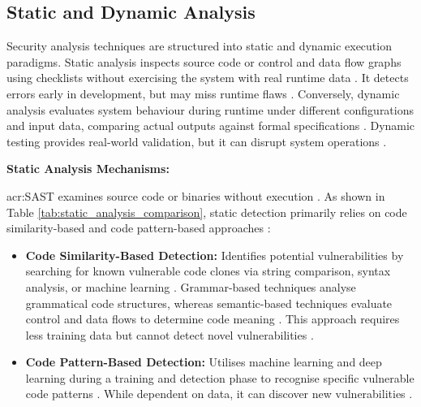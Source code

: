 \subsection{Static and Dynamic Analysis}
\label{subsec:static_dynamic_analysis}

Security analysis techniques are structured into static and dynamic execution paradigms. Static analysis inspects source code or control and data flow graphs using checklists without exercising the system with real runtime data \cite[p. 35]{richier2011security}. It detects errors early in development, but may miss runtime flaws \cite[p. 1]{cong2024overview}. Conversely, dynamic analysis evaluates system behaviour during runtime under different configurations and input data, comparing actual outputs against formal specifications \cite[p. 35]{richier2011security}. Dynamic testing provides real-world validation, but it can disrupt system operations \cite[p. 1]{cong2024overview}. 

\textbf{Static Analysis Mechanisms:} 

\gls{acr:SAST} examines source code or binaries without execution \cite{GeeksforGeeksSecurityTesting}. As shown in Table \ref{tab:static_analysis_comparison}, static detection primarily relies on code similarity-based and code pattern-based approaches \cite[pp. 3]{cong2024overview}:

\begin{itemize}
	\item \textbf{Code Similarity-Based Detection:} Identifies potential vulnerabilities by searching for known vulnerable code clones via string comparison, syntax analysis, or machine learning \cite[p. 3]{cong2024overview}. Grammar-based techniques analyse grammatical code structures, whereas semantic-based techniques evaluate control and data flows to determine code meaning \cite[pp. 4]{cong2024overview}. This approach requires less training data but cannot detect novel vulnerabilities \cite[p. 8]{cong2024overview}.
	
	\item \textbf{Code Pattern-Based Detection:} Utilises machine learning and deep learning during a training and detection phase to recognise specific vulnerable code patterns \cite[p. 5]{cong2024overview}. While dependent on data, it can discover new vulnerabilities \cite[p. 8]{cong2024overview}.
\end{itemize}

